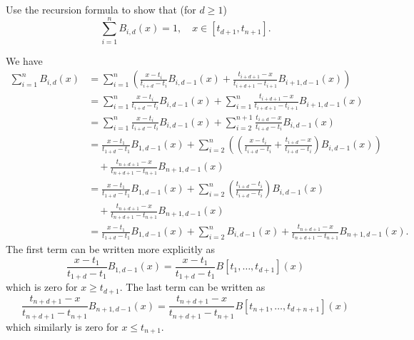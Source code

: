 \begin{exercise}
    Use the recursion formula to show that (for $d \geq 1$)
    \begin{equation*}
        \sum_{i = 1}^{n} B_{i, d}(x) = 1,
        \quad x \in [t_{d+1}, t_{n+1}].
    \end{equation*}
\end{exercise}

\begin{solution}
    We have
    \begin{align*}
        \sum_{i = 1}^{n} B_{i, d}(x)
        &= \sum_{i = 1}^{n} \left(
            \frac{x - t_i}{t_{i + d} - t_i} B_{i, d-1}(x)
            + \frac{t_{i + d + 1} - x}{t_{i + d + 1} - t_{i + 1}} B_{i + 1, d-1}(x)
        \right) \\
        &= \sum_{i = 1}^n \frac{x - t_i}{t_{i + d} - t_i} B_{i, d-1}(x)
        + \sum_{i = 1}^{n} \frac{t_{i + d + 1} - x}{t_{i + d + 1} - t_{i + 1}} B_{i + 1, d-1}(x) \\
        &= \sum_{i = 1}^n \frac{x - t_i}{t_{i + d} - t_i} B_{i, d-1}(x)
        + \sum_{i = 2}^{n + 1} \frac{t_{i + d } - x}{t_{i + d} - t_{i}} B_{i, d-1}(x) \\
        &= \frac{x - t_1}{t_{1 + d} - t_1} B_{1, d-1}(x)
        + \sum_{i = 2}^{n} \left(
            \left(
                \frac{x - t_i}{t_{i + d} - t_i}
                + \frac{t_{i + d} - x}{t_{i + d} - t_{i}}
            \right) B_{i, d-1}(x)
        \right) \\
        &\quad + \frac{t_{n + d + 1} - x}{t_{n + d + 1} - t_{n + 1}} B_{n + 1, d-1}(x) \\
        &= \frac{x - t_1}{t_{1 + d} - t_1} B_{1, d-1}(x)
        + \sum_{i = 2}^{n} \left(
            \frac{t_{i + d} - t_i}{t_{i + d} - t_i}
        \right) B_{i, d-1}(x) \\
        &\quad + \frac{t_{n + d + 1} - x}{t_{n + d + 1} - t_{n + 1}} B_{n + 1, d-1}(x) \\
        &= \frac{x - t_1}{t_{1 + d} - t_1} B_{1, d-1}(x)
        + \sum_{i = 2}^{n} B_{i, d-1}(x)
        + \frac{t_{n + d + 1} - x}{t_{n + d + 1} - t_{n + 1}} B_{n + 1, d-1}(x).
    \end{align*}
    The first term can be written more explicitly as
    \begin{equation*}
        \frac{x - t_1}{t_{1 + d} - t_1} B_{1, d-1}(x)
        = \frac{x - t_1}{t_{1 + d} - t_1} B[t_1, \ldots, t_{d+1}](x)
    \end{equation*}
    which is zero for $x \geq t_{d+1}$.
    The last term can be written as
    \begin{equation*}
        \frac{t_{n + d + 1} - x}{t_{n + d + 1} - t_{n + 1}} B_{n + 1, d-1}(x)
        = \frac{t_{n + d + 1} - x}{t_{n + d + 1} - t_{n + 1}} B[t_{n + 1}, \ldots, t_{d + n + 1}](x)
    \end{equation*}
    which similarly is zero for $x \leq t_{n + 1}$.


\end{solution}
